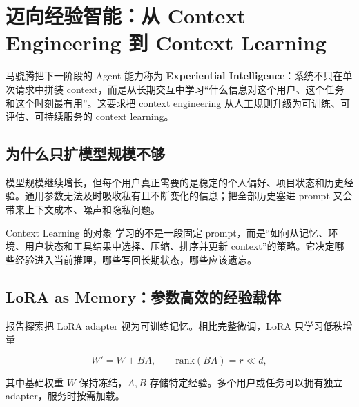 \section{迈向经验智能：从 Context Engineering 到 Context Learning}

马骁腾把下一阶段的 Agent 能力称为 \textbf{Experiential Intelligence}：系统不只在单次请求中拼装 context，而是从长期交互中学习“什么信息对这个用户、这个任务和这个时刻最有用”。这要求把 context engineering 从人工规则升级为可训练、可评估、可持续服务的 context learning。


\subsection{为什么只扩模型规模不够}

模型规模继续增长，但每个用户真正需要的是稳定的个人偏好、项目状态和历史经验。通用参数无法及时吸收私有且不断变化的信息；把全部历史塞进 prompt 又会带来上下文成本、噪声和隐私问题。



\begin{importantbox}{Context Learning 的对象}
学习的不是一段固定 prompt，而是“如何从记忆、环境、用户状态和工具结果中选择、压缩、排序并更新 context”的策略。它决定哪些经验进入当前推理，哪些写回长期状态，哪些应该遗忘。
\end{importantbox}

\subsection{LoRA as Memory：参数高效的经验载体}

报告探索把 LoRA adapter 视为可训练记忆。相比完整微调，LoRA 只学习低秩增量

$$
W'=W+BA,\qquad \mathrm{rank}(BA)=r\ll d,
$$

其中基础权重 $W$ 保持冻结，$A,B$ 存储特定经验。多个用户或任务可以拥有独立 adapter，服务时按需加载。


